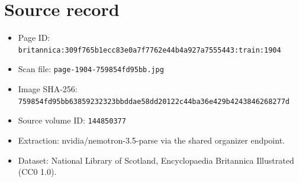\documentclass{article}
\begin{document}
\section*{Source record}
\begin{itemize}
\item Page ID: \texttt{britannica:309f765b1ecc83e0a7f7762e44b4a927a7555443:train:1904}
\item Scan file: \texttt{page-1904-759854fd95bb.jpg}
\item Image SHA-256: \texttt{759854fd95bb63859232323bbddae58dd20122c44ba36e429b4243846268277d}
\item Source volume ID: \texttt{144850377}
\item Extraction: nvidia/nemotron-3.5-parse via the shared organizer endpoint.
\item Dataset: National Library of Scotland, Encyclopaedia Britannica Illustrated (CC0 1.0).
\end{itemize}
\end{document}
